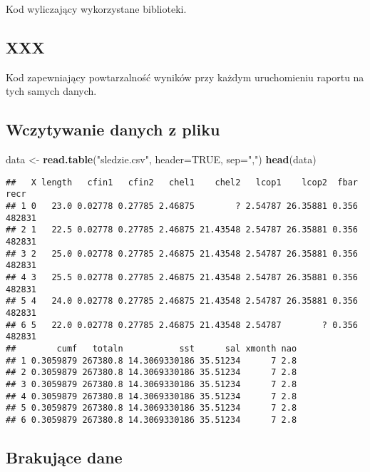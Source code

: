 \documentclass[]{article}
\newenvironment{Shaded}{\begin{snugshade}}{\end{snugshade}}
\newcommand{\DataTypeTok}[1]{\textcolor[rgb]{0.13,0.29,0.53}{#1}}
\newcommand{\KeywordTok}[1]{\textcolor[rgb]{0.13,0.29,0.53}{\textbf{#1}}}
\newcommand{\NormalTok}[1]{#1}
\newcommand{\OtherTok}[1]{\textcolor[rgb]{0.56,0.35,0.01}{#1}}
\newcommand{\StringTok}[1]{\textcolor[rgb]{0.31,0.60,0.02}{#1}}
\begin{document}
Kod wyliczający wykorzystane biblioteki.

\hypertarget{xxx}{%
\subsection{XXX }\label{xxx}}

Kod zapewniający powtarzalność wyników przy każdym uruchomieniu raportu
na tych samych danych.

\hypertarget{wczytywanie-danych-z-pliku}{%
\subsection{Wczytywanie danych z pliku
}\label{wczytywanie-danych-z-pliku}}

\begin{Shaded}
\begin{Highlighting}[]
\NormalTok{data <-}\StringTok{ }\KeywordTok{read.table}\NormalTok{(}\StringTok{"sledzie.csv"}\NormalTok{, }\DataTypeTok{header=}\OtherTok{TRUE}\NormalTok{, }\DataTypeTok{sep=}\StringTok{","}\NormalTok{)}
\KeywordTok{head}\NormalTok{(data)}
\end{Highlighting}
\end{Shaded}

\begin{verbatim}
##   X length   cfin1   cfin2   chel1    chel2   lcop1    lcop2  fbar   recr
## 1 0   23.0 0.02778 0.27785 2.46875        ? 2.54787 26.35881 0.356 482831
## 2 1   22.5 0.02778 0.27785 2.46875 21.43548 2.54787 26.35881 0.356 482831
## 3 2   25.0 0.02778 0.27785 2.46875 21.43548 2.54787 26.35881 0.356 482831
## 4 3   25.5 0.02778 0.27785 2.46875 21.43548 2.54787 26.35881 0.356 482831
## 5 4   24.0 0.02778 0.27785 2.46875 21.43548 2.54787 26.35881 0.356 482831
## 6 5   22.0 0.02778 0.27785 2.46875 21.43548 2.54787        ? 0.356 482831
##        cumf   totaln           sst      sal xmonth nao
## 1 0.3059879 267380.8 14.3069330186 35.51234      7 2.8
## 2 0.3059879 267380.8 14.3069330186 35.51234      7 2.8
## 3 0.3059879 267380.8 14.3069330186 35.51234      7 2.8
## 4 0.3059879 267380.8 14.3069330186 35.51234      7 2.8
## 5 0.3059879 267380.8 14.3069330186 35.51234      7 2.8
## 6 0.3059879 267380.8 14.3069330186 35.51234      7 2.8
\end{verbatim}

\hypertarget{brakujux105ce-dane}{%
\subsection{Brakujące dane }\label{brakujux105ce-dane}}
\end{document}
